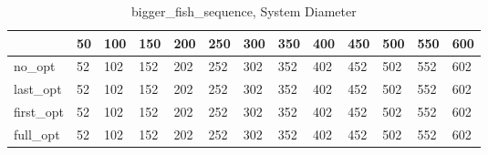 \begin{table}
\caption{bigger\_fish\_sequence, System Diameter}
\label{bigger_fish_sequence_diam}
\begin{tabular}{lllllllllllll}
\toprule
 & 50 & 100 & 150 & 200 & 250 & 300 & 350 & 400 & 450 & 500 & 550 & 600 \\
\midrule
no\_opt & 52 & 102 & 152 & 202 & 252 & 302 & 352 & 402 & 452 & 502 & 552 & 602 \\
last\_opt & 52 & 102 & 152 & 202 & 252 & 302 & 352 & 402 & 452 & 502 & 552 & 602 \\
first\_opt & 52 & 102 & 152 & 202 & 252 & 302 & 352 & 402 & 452 & 502 & 552 & 602 \\
full\_opt & 52 & 102 & 152 & 202 & 252 & 302 & 352 & 402 & 452 & 502 & 552 & 602 \\
\bottomrule
\end{tabular}
\end{table}
